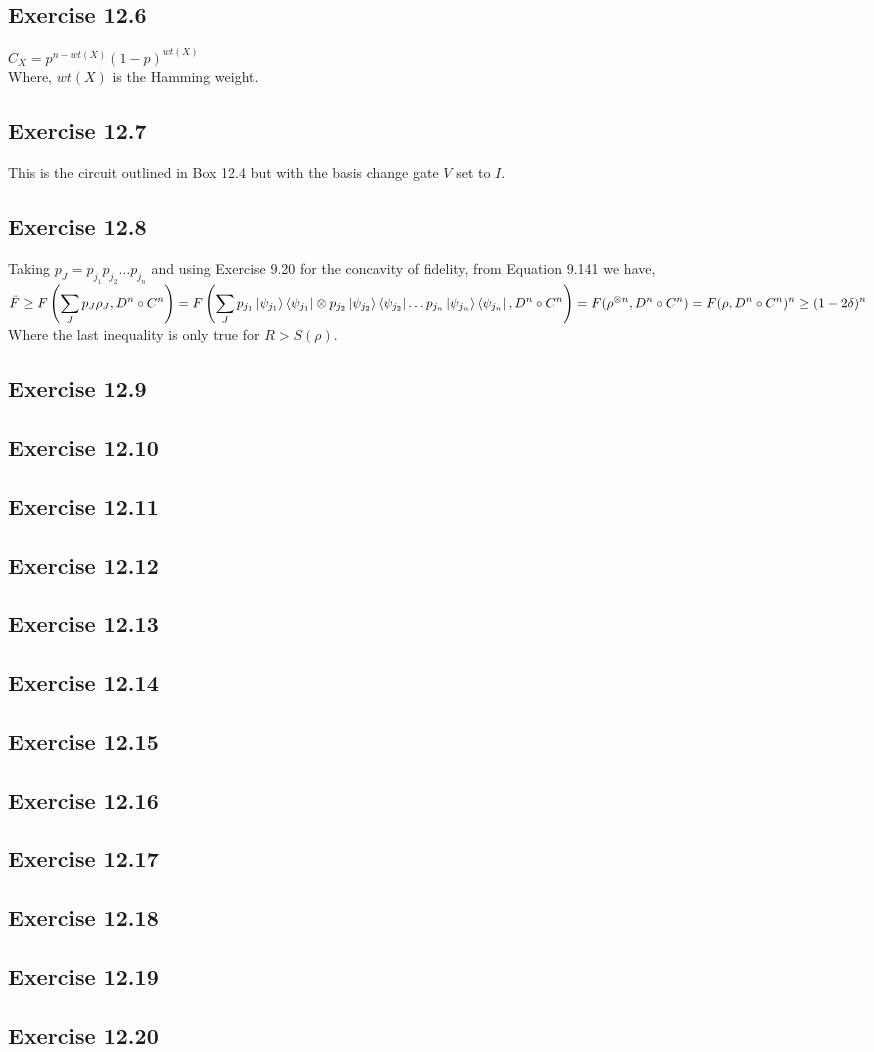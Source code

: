 \documentclass[a4paper,12pt]{article}
\begin{document}
\subsection*{Exercise 12.6}
$C_X=p^{n-wt(X)}(1-p)^{wt(X)}$\\
Where, $wt(X)$ is the Hamming weight.
\subsection*{Exercise 12.7}
This is the circuit outlined in Box 12.4 but with the basis change gate $V$ set to $I$.
\subsection*{Exercise 12.8}
Taking $p_J=p_{j_1}p_{j_2}\ldots p_{j_n}$ and using Exercise 9.20 for the concavity of fidelity,
 from Equation 9.141 we have,\\
$\bar{F}\geq \displaystyle F\left(\sum_Jp_J\rho_J, D^n \circ C^n\right)=
F\left(\sum_Jp_{j_1}\ket{\psi_{j_1}}\bra{\psi_{j_1}}\otimes p_{j_2}\ket{\psi_{j_2}}\bra{\psi_{j_2}}
\ldots p_{j_n}\ket{\psi_{j_n}}\bra{\psi_{j_n}}, D^n \circ C^n\right)=
F(\rho^{\otimes n},D^n \circ C^n)=F(\rho, D^n \circ C^n)^n\geq (1-2\delta)^n$\\
Where the last inequality is only true for $R>S(\rho)$.
\subsection*{Exercise 12.9}

\subsection*{Exercise 12.10}
\subsection*{Exercise 12.11}
\subsection*{Exercise 12.12}
\subsection*{Exercise 12.13}
\subsection*{Exercise 12.14}
\subsection*{Exercise 12.15}
\subsection*{Exercise 12.16}
\subsection*{Exercise 12.17}
\subsection*{Exercise 12.18}
\subsection*{Exercise 12.19}
\subsection*{Exercise 12.20}
\end{document}
